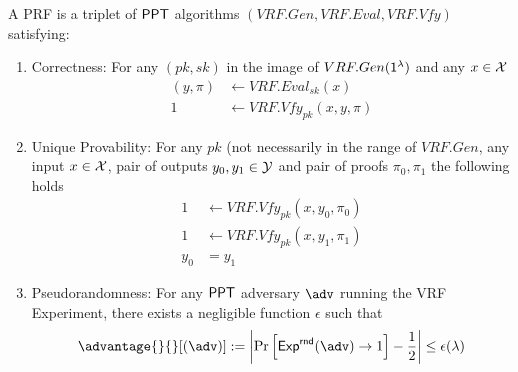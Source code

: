\begin{definition}

    A PRF is a triplet of $\mathsf{PPT}$ algorithms $(VRF.Gen, VRF.Eval, VRF.Vfy)$ satisfying:
    \begin{enumerate}
        \item Correctness: For any $(pk, sk)$ in the image of $VRF.Gen(\mathsf{1^{\lambda}})$ and any $x \in \mathcal{X}$
        \[
        \begin{aligned}
            (y, \pi) &\gets VRF.Eval_{sk}(x) \\
            1 &\gets VRF.Vfy_{pk}(x, y, \pi)
        \end{aligned}
        \]


    \item Unique Provability: For any $pk$ (not necessarily in the range of $VRF.Gen$, any input $x \in \mathcal{X}$, pair of outputs $y_0, y_1 \in \mathcal{Y}$ and pair of proofs $\pi_0, \pi_1$ the following holds
    \[
        \begin{aligned}
            1 &\gets VRF.Vfy_{pk}(x,y_0,\pi_0) \\
            1 &\gets VRF.Vfy_{pk}(x,y_1,\pi_1) \\
            y_0 &= y_1
        \end{aligned}
    \]

    \item Pseudorandomness: For any $\mathsf{PPT}$ adversary $\adv$ running the VRF Experiment, there exists a negligible function $\epsilon$ such that 
    \[
         \advantage{}{}[(\adv)] := 
            \left|
        \Pr     \left[ 
                    \mathsf{Exp}^{\mathsf{rnd}}(\adv) \to 1
                \right] - \frac{1}{2}
            \right| \leq \epsilon(\lambda)
    \]
    
    \end{enumerate}

\end{definition}

